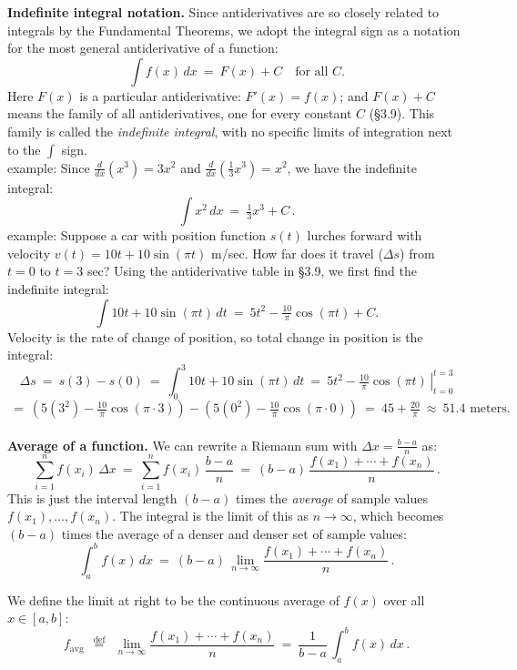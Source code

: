 \documentclass[11pt]{article}
\begin{document}
\noindent
{\bf Indefinite integral notation.} 
Since antiderivatives are so closely related to integrals by the
 Fundamental Theorems, we adopt the integral sign as a notation for the most general antiderivative of a function:
$$
\int f(x)\,dx \ = \ F(x)+C \quad\text{for all $C$.}
$$
Here $F(x)$ is a particular antiderivative: $F'(x)=f(x)$;
and $F(x)+C$ means the family of all antiderivatives, one
for every constant $C$ (\S3.9). This family is called the
{\it indefinite integral}, with no specific limits of integration
next to the $\int$ sign.
\\[.5em]
{\sc example:} Since $\frac{d}{dx}(x^3)=3x^2$ 
and $\frac{d}{dx}(\frac13x^3)=x^2$, we have the indefinite integral:
$$
\int x^2\,dx \ =\ \tfrac13x^3 + C\,.
$$
{\sc example:} Suppose a car with position function $s(t)$ 
lurches forward with velocity $v(t) =10t + 10\sin(\pi t)$ m/sec. 
How far does it travel ($\Delta s$) from $t=0$ to $t=3$ sec?
Using the antiderivative table in \S3.9, we first find
the indefinite integral:
$$
\int 10t+ 10\sin(\pi t)\,dt \ = \ 5t^2 -\tfrac{10}{\pi}\cos(\pi t)+C.
$$
Velocity is the rate of change of position, so total change in position is
the integral:
$$
\Delta s\ =\ s(3)-s(0) \ =\ \int_0^3 10t+ 10\sin(\pi t)\,dt
 \ = \ \left.5t^2 -\tfrac{10}{\pi}\cos(\pi t)\,\right|_{t=0}^{t=3}
$$
$$
\ =\ \left(5(3^2) -\tfrac{10}{\pi}\cos(\pi{\cdot} 3)\right)
- \left(5(0^2) -\tfrac{10}{\pi}\cos(\pi{\cdot} 0)\right)
\ =\ 45 + \tfrac{20}{\pi}
\ \approx\  51.4 \text{ meters.}
$$
\\[0em] 
{\bf Average of a function.} We can rewrite a Riemann sum with $\Delta x = \frac{b-a}n$  as:
$$
\sum_{i=1}^n f(x_i)\,\Delta x
\ = \ 
 \sum_{i=1}^n f(x_i)\,\frac{b{-}a}{n}
\ = \ 
(b{-}a)\,\frac{f(x_1)+\cdots +f(x_n)}{n}\,.
$$
This is just the interval length $(b{-}a)$
times the {\it average} of sample values $f(x_1),\ldots,f(x_n)$.
The integral is the limit of this as $n\to\infty$, which
becomes $(b{-}a)$ times the average of 
a denser and denser set of sample values:
$$
\int_a^b f(x)\,dx
\ =\ 
(b{-}a)\, \lim_{n\to\infty} \frac{f(x_1)+\cdots+f(x_n)}{n}\,.
$$

\addtolength{\textheight}{4em}

\pagebreak 

\addtolength{\topmargin}{-1em}

\noindent
We define the limit at right to be the continuous average of $f(x)$ over all $x\in[a,b]$:
$$
f_{\text{avg}} 
\ \ \stackrel{\text{def}}=\ \ 
\lim_{n\to\infty} \frac{f(x_1)+\cdots+f(x_n)}{n}
\ =\ 
\frac{1}{b{-}a}\,\int_a^b f(x)\,dx\,.
$$
\end{document}
